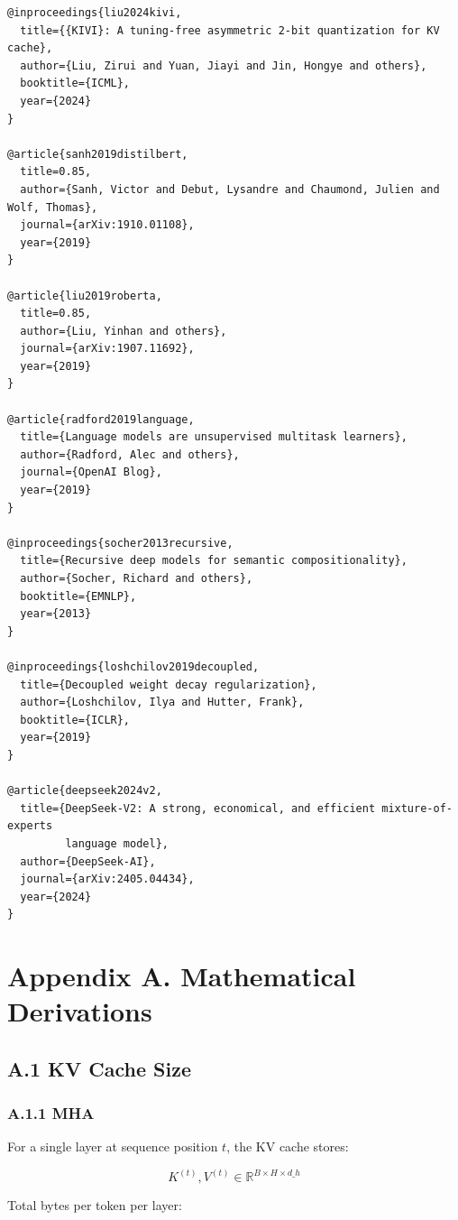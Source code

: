 \begin{lstlisting}
@inproceedings{liu2024kivi,
  title={{KIVI}: A tuning-free asymmetric 2-bit quantization for KV cache},
  author={Liu, Zirui and Yuan, Jiayi and Jin, Hongye and others},
  booktitle={ICML},
  year={2024}
}

@article{sanh2019distilbert,
  title=0.85,
  author={Sanh, Victor and Debut, Lysandre and Chaumond, Julien and Wolf, Thomas},
  journal={arXiv:1910.01108},
  year={2019}
}

@article{liu2019roberta,
  title=0.85,
  author={Liu, Yinhan and others},
  journal={arXiv:1907.11692},
  year={2019}
}

@article{radford2019language,
  title={Language models are unsupervised multitask learners},
  author={Radford, Alec and others},
  journal={OpenAI Blog},
  year={2019}
}

@inproceedings{socher2013recursive,
  title={Recursive deep models for semantic compositionality},
  author={Socher, Richard and others},
  booktitle={EMNLP},
  year={2013}
}

@inproceedings{loshchilov2019decoupled,
  title={Decoupled weight decay regularization},
  author={Loshchilov, Ilya and Hutter, Frank},
  booktitle={ICLR},
  year={2019}
}

@article{deepseek2024v2,
  title={DeepSeek-V2: A strong, economical, and efficient mixture-of-experts 
         language model},
  author={DeepSeek-AI},
  journal={arXiv:2405.04434},
  year={2024}
}
\end{lstlisting}


\section{Appendix A. Mathematical Derivations}

\subsection{A.1 KV Cache Size}

\subsubsection{A.1.1 MHA}

For a single layer at sequence position $t$, the KV cache stores:

\[
K^{(t)}, V^{(t)} \in \mathbb{R}^{B \times H \times d\_h}
\tag{A.1}
\]

Total bytes per token per layer:

